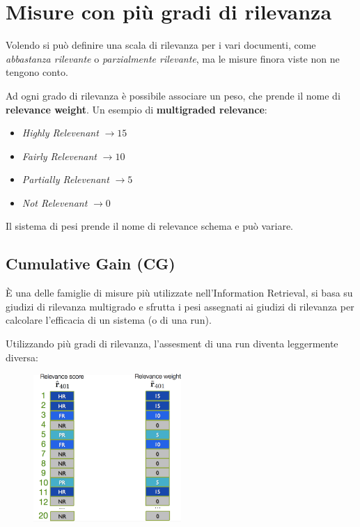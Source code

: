 

\section{Misure con più gradi di rilevanza}

Volendo si può definire una scala di rilevanza per i vari documenti, come \textit{abbastanza rilevante} o \textit{parzialmente rilevante}, ma le misure finora viste non ne tengono conto.

Ad ogni grado di rilevanza è possibile associare un peso, che prende il nome di \textbf{relevance weight}. Un esempio di \textbf{multigraded relevance}:

\begin{itemize}
	\item \textit{Highly Relevenant} $\to 15$
	\item \textit{Fairly Relevenant} $\to 10$
	\item \textit{Partially Relevenant} $\to 5$
	\item \textit{Not Relevenant} $\to 0$
\end{itemize}

\noindent Il sistema di pesi prende il nome di relevance schema e può variare.

\subsection{Cumulative Gain (CG)}

\`E una delle famiglie di misure più utilizzate nell'Information Retrieval, si basa su giudizi di rilevanza multigrado e sfrutta i pesi assegnati ai giudizi di rilevanza per calcolare l'efficacia di un sistema (o di una run).

Utilizzando più gradi di rilevanza, l'assesment di una run diventa leggermente diversa:

\begin{figure}[htbp]
	\centering
	\includegraphics[width=0.5\textwidth]{images/l16-fig-1.png}
\end{figure}

